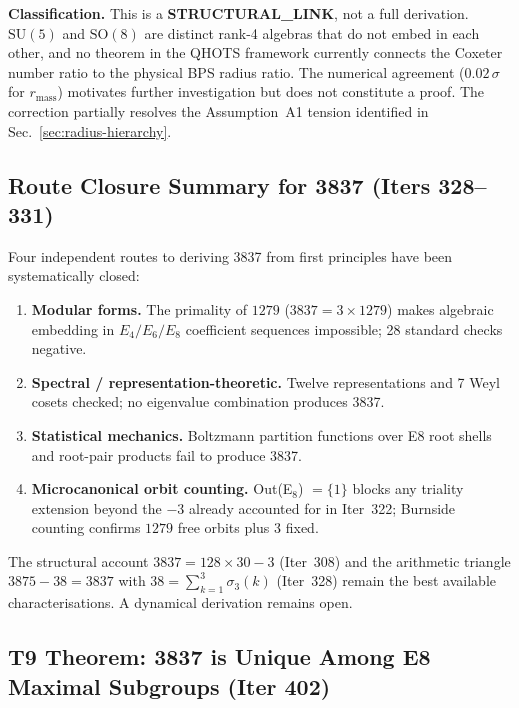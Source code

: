 \documentclass[aps,prd,twocolumn,superscriptaddress,floatfix,nofootinbib]{revtex4-2}
\theoremstyle{definition}
\theoremstyle{remark}
\begin{document}
\textbf{Classification.}  This is a \textbf{STRUCTURAL\_LINK}, not a full
derivation.  $\mathrm{SU}(5)$ and $\mathrm{SO}(8)$ are distinct rank-4 algebras
that do not embed in each other, and no theorem in the QHOTS framework currently
connects the Coxeter number ratio to the physical BPS radius ratio.  The
numerical agreement ($0.02\,\sigma$ for $r_{\mathrm{mass}}$) motivates further
investigation but does not constitute a proof.  The correction partially resolves
the Assumption~A1 tension identified in Sec.~\ref{sec:radius-hierarchy}.

\subsection{Route Closure Summary for 3837 (Iters 328--331)}
\label{sec:3837-closures}

Four independent routes to deriving 3837 from first principles have been
systematically closed:
\begin{enumerate}
  \item \textbf{Modular forms.}  The primality of $1279$ ($3837 = 3\times 1279$)
        makes algebraic embedding in $E_4/E_6/E_8$ coefficient sequences
        impossible; 28 standard checks negative.
  \item \textbf{Spectral / representation-theoretic.}  Twelve representations and
        7 Weyl cosets checked; no eigenvalue combination produces 3837.
  \item \textbf{Statistical mechanics.}  Boltzmann partition functions over E8 root
        shells and root-pair products fail to produce 3837.
  \item \textbf{Microcanonical orbit counting.}  Out(E$_8$) $= \{1\}$ blocks any
        triality extension beyond the $-3$ already accounted for in Iter~322;
        Burnside counting confirms $1279$ free orbits plus 3 fixed.
\end{enumerate}
The structural account $3837 = 128\times 30 - 3$ (Iter~308) and the arithmetic
triangle $3875 - 38 = 3837$ with $38 = \sum_{k=1}^{3}\sigma_3(k)$ (Iter~328)
remain the best available characterisations.  A dynamical derivation remains open.

\subsection{T9 Theorem: 3837 is Unique Among E8 Maximal Subgroups (Iter 402)}
\label{sec:3837-maximal-subgroup}
\end{document}
